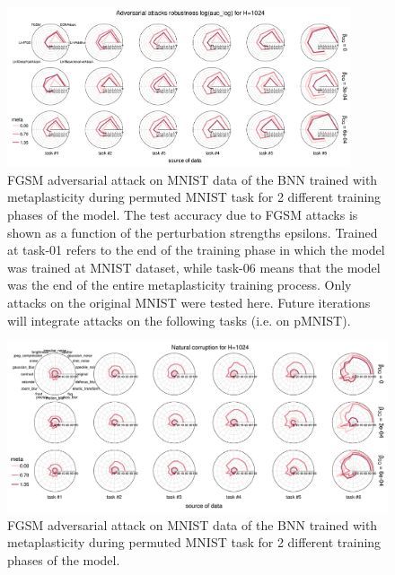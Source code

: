 \documentclass[manuscript,screen,review]{acmart}
\begin{document}
\begin{figure}
    \centering
    \includegraphics[width=0.9\textwidth]{figures/report/Fig4.pdf}
    \caption{FGSM adversarial attack on MNIST data of the BNN trained with metaplasticity during permuted MNIST task for 2 different training phases of the model. The test accuracy due to FGSM attacks is shown as a function of the perturbation strengths epsilons. Trained at task-01 refers to the end of the training phase in which the model was trained at MNIST dataset, while task-06 means that the model was the end of the entire metaplasticity training process. Only attacks on the original MNIST were tested here. Future iterations will integrate attacks on the following tasks (i.e. on pMNIST). }
    \label{fig:fig4}
\end{figure}



\begin{figure}
    \centering
    \includegraphics[width=\textwidth]{figures/report/Fig5.pdf}
    \caption{FGSM adversarial attack on MNIST data of the BNN trained with metaplasticity during permuted MNIST task for 2 different training phases of the model. 
    }
    \label{fig:fig5}
\end{figure}
\end{document}
